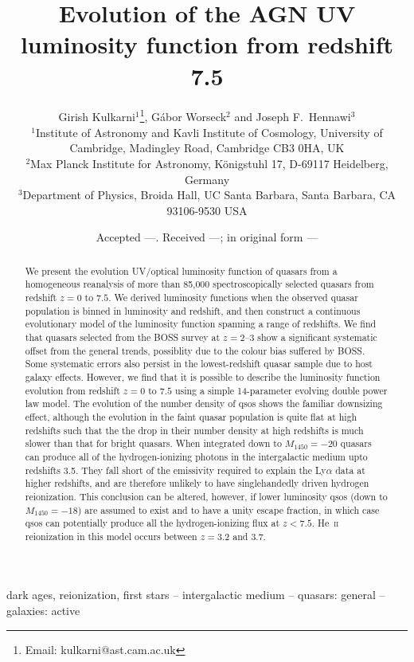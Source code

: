 \documentclass[a4paper,fleqn,usenatbib]{mnras}
\title[AGN luminosity function]{Evolution of the AGN UV luminosity function from redshift 7.5}
\author[Kulkarni et al.]{{Girish Kulkarni$^{1}$\thanks{Email:
      kulkarni@ast.cam.ac.uk}, G\'abor Worseck$^{2}$ and Joseph
    F.~Hennawi$^{3}$} \\ $^1$Institute of Astronomy and Kavli
  Institute of Cosmology, University of Cambridge, Madingley Road,
  Cambridge CB3 0HA, UK \\ $^2$Max Planck Institute for Astronomy,
  K\"onigstuhl 17, D-69117 Heidelberg, Germany\\ $^3$Department of
  Physics, Broida Hall, UC Santa Barbara, Santa Barbara, CA 93106-9530
  USA}
\date{Accepted ---. Received ---; in original form ---}
\begin{document}
\label{firstpage}
\pagerange{\pageref{firstpage}--\pageref{lastpage}}
\maketitle

\begin{abstract}
We present the evolution UV/optical luminosity function of quasars
from a homogeneous reanalysis of more than 85,000 spectroscopically
selected quasars from redshift $z=0$ to $7.5$.  We derived luminosity
functions when the observed quasar population is binned in luminosity
and redshift, and then construct a continuous evolutionary model of
the luminosity function spanning a range of redshifts.  We find that
quasars selected from the BOSS survey at $z=2$--$3$ show a significant
systematic offset from the general trends, possiblity due to the
colour bias suffered by BOSS.  Some systematic errors also persist in
the lowest-redshift quasar sample due to host galaxy effects. However,
we find that it is possible to describe the luminosity function
evolution from redshift $z=0$ to $7.5$ using a simple 14-parameter
evolving double power law model.  The evolution of the number density
of qsos shows the familiar downsizing effect, although the evolution
in the faint quasar population is quite flat at high redshifts such
that the the drop in their number density at high redshifts is much
slower than that for bright quasars.  When integrated down to
$M_{1450}=-20$ quasars can produce all of the hydrogen-ionizing
photons in the intergalactic medium upto redshifts 3.5.  They fall
short of the emissivity required to explain the Ly$\alpha$ data at
higher redshifts, and are therefore unlikely to have singlehandedly
driven hydrogen reionization.  This conclusion can be altered,
however, if lower luminosity qsos (down to $M_{1450}=-18$) are assumed
to exist and to have a unity escape fraction, in which case qsos can
potentially produce all the hydrogen-ionizing flux at $z<7.5$.
He~\textsc{ii} reionization in this model occurs between $z=3.2$ and
$3.7$.
\end{abstract}

\begin{keywords}
dark ages, reionization, first stars -- intergalactic medium --
quasars: general -- galaxies: active
\end{keywords}

\end{document}
